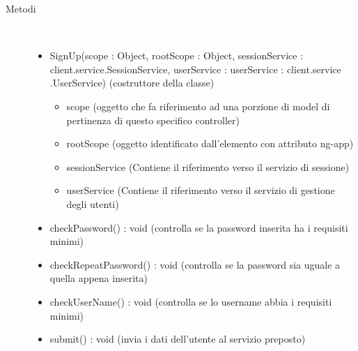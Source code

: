\begin{description}
\item[Metodi] \hfill \\
 \vspace{-7mm}
\begin{itemize}
\item SignUp(scope : Object, rootScope : Object, sessionService : client.service.SessionService, userService : userService : client.service .UserService) (costruttore della classe)\begin{itemize}
\item scope (oggetto che fa riferimento ad una porzione di model di pertinenza di questo specifico controller)
\item rootScope (oggetto identificato dall’elemento con attributo ng-app)
\item sessionService (Contiene il riferimento verso il servizio di sessione)
\item userService (Contiene il riferimento verso il servizio di gestione degli utenti)
\end{itemize}

\item checkPassword() : void (controlla se la password inserita ha i requisiti minimi)
\item checkRepeatPassword() : void (controlla se la password sia uguale a quella appena inserita)
\item checkUserName() : void (controlla se lo username abbia i requisiti minimi)
\item submit() : void (invia i dati dell'utente al servizio preposto)
\end{itemize}

\end{description}

\vspace{0.5cm}
